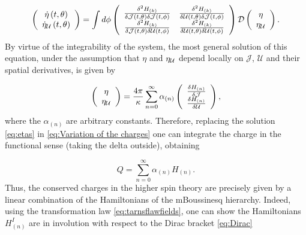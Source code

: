 \documentclass[letterpaper,11pt,oneside]{book}
\begin{document}
\[
\left(\begin{array}{c}
	\dot{\eta}\left(t,\theta\right)\\
	\dot{\eta}_{{\cal U}}\left(t,\theta\right)
\end{array}\right)=\int d\phi\left(\begin{array}{cc}
	\frac{\delta^{2}H_{\left(k\right)}}{\delta\mathcal{J}\left(t,\theta\right)\delta\mathcal{J}\left(t,\phi\right)} & \frac{\delta^{2}H_{\left(k\right)}}{\delta{\cal U}\left(t,\theta\right)\delta\mathcal{J}\left(t,\phi\right)}\\
	\frac{\delta^{2}H_{\left(k\right)}}{\delta\mathcal{J}\left(t,\theta\right)\delta{\cal U}\left(t,\phi\right)} & \frac{\delta^{2}H_{\left(k\right)}}{\delta{\cal U}\left(t,\theta\right)\delta{\cal U}\left(t,\phi\right)}
\end{array}\right)\mathcal{D}\left(\begin{array}{c}
	\eta\\
	\eta_{{\cal U}}
\end{array}\right).
\]
By virtue of the integrability of the system, the most general solution
of this equation, under the assumption that $\eta$ and $\eta_{{\cal U}}$
depend locally on $\mathcal{J}$, $\mathcal{U}$ and their spatial
derivatives, is given by

\begin{equation}
	\left(\begin{array}{c}
		\eta\\
		\eta_{{\cal U}}
	\end{array}\right)=\frac{4\pi}{\kappa}\sum_{n=0}^{\infty}\alpha_{\left(n\right)}\left(\begin{array}{c}
		\frac{\delta H_{\left(n\right)}}{\delta\mathcal{J}}\\
		\frac{\delta H_{\left(n\right)}}{\delta\mathcal{U}}
	\end{array}\right),\label{eq:etas}
\end{equation}
where the $\alpha_{\left(n\right)}$ are arbitrary constants. Therefore,
replacing the solution \eqref{eq:etas} in \eqref{eq:Variation of the charges}
one can integrate the charge in the functional sense (taking the delta
outside), obtaining

\[
Q=\sum_{n=0}^{\infty}\alpha_{\left(n\right)}H_{\left(n\right)}.
\]
Thus, the conserved charges in the higher spin theory are precisely
given by a linear combination of the Hamiltonians of the mBoussinesq
hierarchy. Indeed, using the transformation law \eqref{eq:tarnsflawfields},
one can show the Hamiltonians $H_{\left(n\right)}^{I}$ are in involution
with respect to the Dirac bracket \eqref{eq:Dirac}
\end{document}
